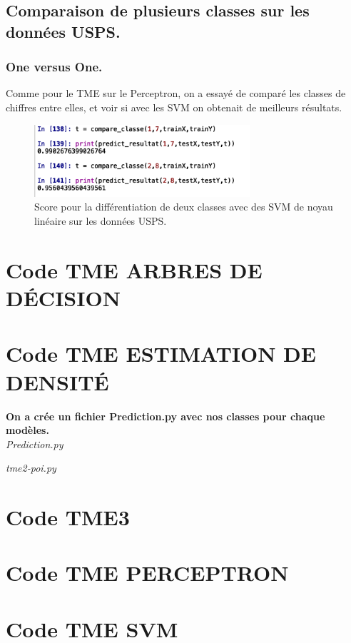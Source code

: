 \documentclass{article}
\begin{document}
\subsection{Comparaison de plusieurs classes sur les données USPS.}
\subsubsection{One versus One.}
Comme pour le TME sur le Perceptron, on a essayé de comparé les classes de chiffres entre elles, et voir si avec les SVM on obtenait de meilleurs résultats.\\
\begin{figure}[h]
	\center
	\includegraphics[width=8cm]{figure/tme6/oneversusall.png} 
	 \caption{Score pour la différentiation de deux classes avec des SVM de noyau linéaire sur les données USPS. }
	 
\end{figure}
\clearpage
\appendix
\section{Code TME ARBRES DE DÉCISION}

\clearpage
\section{Code TME ESTIMATION DE DENSITÉ}
\textbf{On a crée un fichier Prediction.py avec nos classes pour chaque modèles.}\\
\textit{Prediction.py}

\textit{tme2-poi.py}

\clearpage
\section{Code TME3}

\clearpage
\section{Code TME PERCEPTRON}

\clearpage
\section{Code TME SVM}

\end{document}
